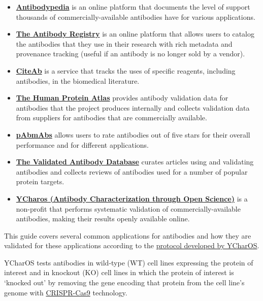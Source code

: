 \documentclass[letterpaper, 12pt]{article}
\begin{document}
\begin{itemize}
    \setlength\itemsep{-0.5em}
    \item \textbf{\href{https://www.antibodypedia.com/}{Antibodypedia}} is an online platform that documents the level of support thousands of commercially-available antibodies have for various applications.
    \item \textbf{\href{https://www.antibodyregistry.org}{The Antibody Registry}} is an online platform that allows users to catalog the antibodies that they use in their research with rich metadata and provenance tracking (useful if an antibody is no longer sold by a vendor).
    \item \textbf{\href{https://www.citeab.com}{CiteAb}} is a service that tracks the uses of specific reagents, including antibodies, in the biomedical literature.
    \item \textbf{\href{https://www.proteinatlas.org/about/antibody+validation}{The Human Protein Atlas}} provides antibody validation data for antibodies that the project produces internally and collects validation data from suppliers for antibodies that are commercially available. 
    \item \textbf{\href{https://pabmabs.com/}{pAbmAbs}} allows users to rate antibodies out of five stars for their overall performance and for different applications.
    \item \textbf{\href{https://www.labome.com/index.html}{The Validated Antibody Database}} curates articles using and validating antibodies and collects reviews of antibodies used for a number of popular protein targets.
    \item \textbf{\href{https://ycharos.com/}{YCharos (Antibody Characterization through Open Science)}} is a non-profit that performs systematic validation of commercially-available antibodies, making their results openly available online.
\end{itemize}

This guide covers several common applications for antibodies and how they are validated for these applications according to the \href{https://doi.org/10.1038/s41596-024-01095-8}{protocol developed by YCharOS}. 

YCharOS tests antibodies in wild-type (WT) cell lines expressing the protein of interest and in knockout (KO) cell lines in which the protein of interest is `knocked out' by removing the gene encoding that protein from the cell line's genome with \href{https://en.wikipedia.org/wiki/CRISPR_gene_editing}{CRISPR-Cas9} technology.
\end{document}
